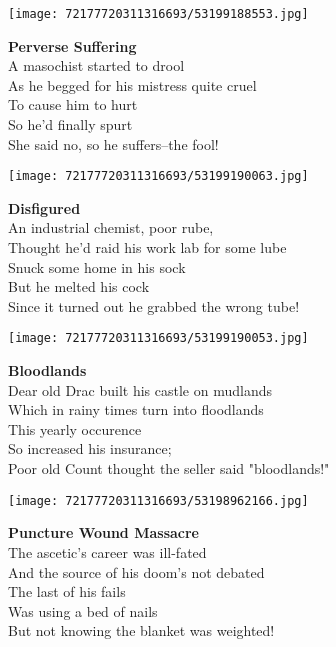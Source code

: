 \documentclass[10pt,letterpaper]{article}
\begin{document}
\begin{center}\texttt{[image: 72177720311316693/53199188553.jpg]}
\end{center}
\begin{center}
\textbf{Perverse Suffering}\\
\vskip 0.2in
A masochist started to drool\\
As he begged for his mistress quite cruel\\
To cause him to hurt\\
So he'd finally spurt\\
She said no, so he suffers--the fool!\\
\end{center}
\pagebreak

\begin{center}\texttt{[image: 72177720311316693/53199190063.jpg]}
\end{center}
\begin{center}
\textbf{Disfigured}\\
\vskip 0.2in
An industrial chemist, poor rube,\\
Thought he'd raid his work lab for some lube\\
Snuck some home in his sock\\
But he melted his cock\\
Since it turned out he grabbed the wrong tube!\\
\end{center}
\pagebreak

\begin{center}\texttt{[image: 72177720311316693/53199190053.jpg]}
\end{center}
\begin{center}
\textbf{Bloodlands}\\
\vskip 0.2in
Dear old Drac built his castle on mudlands\\
Which in rainy times turn into floodlands\\
This yearly occurence\\
So increased his insurance;\\
Poor old Count thought the seller said "bloodlands!"\\
\end{center}
\pagebreak

\begin{center}\texttt{[image: 72177720311316693/53198962166.jpg]}
\end{center}
\begin{center}
\textbf{Puncture Wound Massacre}\\
\vskip 0.2in
The ascetic's career was ill-fated\\
And the source of his doom's not debated\\
The last of his fails\\
Was using a bed of nails\\
But not knowing the blanket was weighted!\\
\end{center}
\pagebreak
\end{document}
